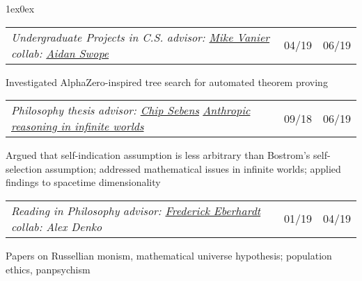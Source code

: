\documentclass[12pt]{article}
\def\myh{20pt}
\def\indentlen{1ex}
\newcommand{\datecolor}{lavender3}
\let\olditalic\textit
\renewcommand{\textit}[1]{\olditalic{\color{lavender} #1}}
\newcommand{\textittwo}[1]{\olditalic{\color{lavender2} #1}}
\newcommand{\mysmallerverticalspace}{\vspace{2pt}}
\newcommand{\datecolwidth}{29pt}
\newcommand{\titlecolwidth}{\textwidth - \datecolwidth*3 + \myh/2 - 5pt}
\begin{document}
{\begin{adjustwidth}{\indentlen}{0ex}
\begin{tabular}{@{}p{\titlecolwidth}r@{|}p{\datecolwidth}@{}}
\textit{Undergraduate Projects in C.S.} \hspace{\rolesep} \textittwo{advisor: \href{http://users.cms.caltech.edu/~mvanier/}{Mike Vanier} \hspace{\rolesep} collab: \href{https://aidanswope.com/about}{Aidan Swope}} & 04/19 & 06/19
\end{tabular}

\color{normaltext}

Investigated AlphaZero-inspired tree search for automated theorem proving

\mysmallerverticalspace

\color{\datecolor}

\begin{tabular}{@{}p{\titlecolwidth}r@{|}p{\datecolwidth}@{}}
\textit{Philosophy thesis} \hspace{\rolesep} \textittwo{advisor: \href{https://sites.google.com/site/csebens/}{Chip Sebens}} \hspace{\rolesep} \href{{https://evgunter.github.io/Anthropic_reasoning_in_infinite_worlds.pdf}}{\it Anthropic reasoning in infinite worlds} & 09/18 & 06/19
\end{tabular}

\color{normaltext}

Argued that self-indication assumption is less arbitrary than Bostrom's self-selection assumption; addressed mathematical issues in infinite worlds; applied findings to spacetime dimensionality

\mysmallerverticalspace

\color{\datecolor}

\begin{tabular}{@{}p{\titlecolwidth}r@{|}p{\datecolwidth}@{}}
\textit{Reading in Philosophy} \hspace{\rolesep} \textittwo{advisor: \href{http://www.its.caltech.edu/~fehardt/}{Frederick Eberhardt} \hspace{\rolesep} collab: Alex Denko} & 01/19 & 04/19
\end{tabular}

\color{normaltext}

Papers on Russellian monism, mathematical universe hypothesis; population ethics, panpsychism


\vspace{-3pt}
\end{adjustwidth}
}
\end{document}
